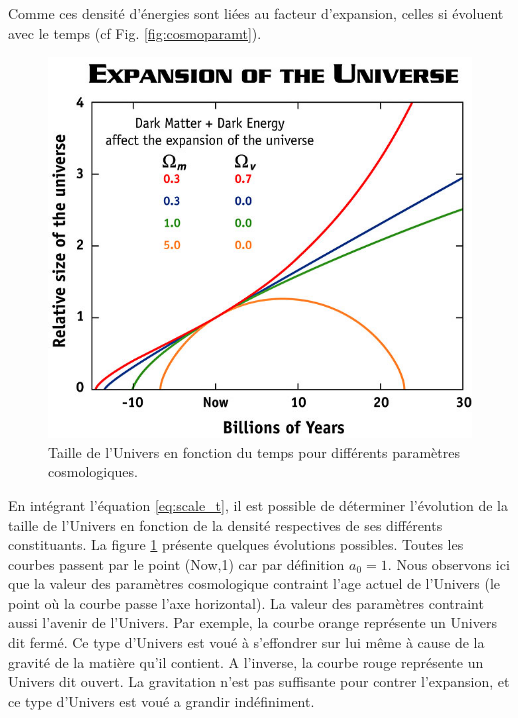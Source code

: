 Comme ces densité d'énergies sont liées au facteur d'expansion, celles si évoluent avec le temps (cf Fig. \ref{fig:cosmoparamt}).

\begin{figure}[bth]
        \includegraphics[width=.9\linewidth]{img/01/scale_t.jpg} 
        \caption[Taille de l'Univers]{Taille de l'Univers en fonction du temps pour différents paramètres cosmologiques.
        }
 		\label{fig:scale_t}
\end{figure}

En intégrant l’équation \ref{eq:scale_t}, il est possible de déterminer l'évolution de la taille de l'Univers en fonction de la densité respectives de ses différents constituants.
La figure \ref{fig:scale_t} présente quelques évolutions possibles.
Toutes les courbes passent par le point (Now,1) car par définition $a_0 = 1$.
Nous observons ici que la valeur des paramètres cosmologique contraint l'age actuel de l'Univers (le point où la courbe passe l'axe horizontal).
La valeur des paramètres contraint aussi l'avenir de l'Univers.
Par exemple, la courbe orange représente un Univers dit fermé.
Ce type d'Univers est voué à s'effondrer sur lui même à cause de la gravité de la matière qu'il contient.
A l'inverse, la courbe rouge représente un Univers dit ouvert.
La gravitation n'est pas suffisante pour contrer l'expansion, et ce type d'Univers est voué a grandir indéfiniment.

